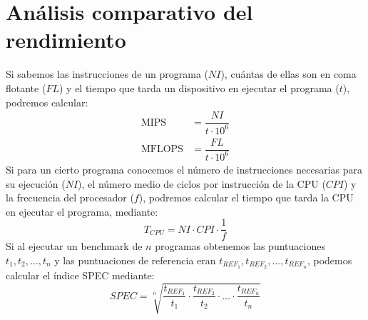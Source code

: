 \section{Análisis comparativo del rendimiento}
Si sabemos las instrucciones de un programa ($NI$), cuántas de ellas son en coma flotante ($FL$) y el tiempo que tarda un dispositivo en ejecutar el programa ($t$), podremos calcular:
\begin{align*}
    \text{MIPS} &= \dfrac{NI}{t\cdot 10^6} \\
    \text{MFLOPS} &= \dfrac{FL}{t\cdot 10^6}
\end{align*}
Si para un cierto programa conocemos el número de instrucciones necesarias para su ejecución ($NI$), el número medio de ciclos por instrucción de la CPU ($CPI$) y la frecuencia del procesador ($f$), podremos calcular el tiempo que tarda la CPU en ejecutar el programa, mediante:
\begin{equation*}
    T_{CPU} = NI\cdot CPI \cdot \dfrac{1}{f}
\end{equation*}
Si al ejecutar un benchmark de $n$ programas obtenemos las puntuaciones $t_1,t_2,\ldots,t_n$ y las puntuaciones de referencia eran $t_{REF_1}, t_{REF_2}, \ldots, t_{REF_n}$, podemos calcular el índice SPEC mediante:
\begin{equation*}
    SPEC = \sqrt[n]{\dfrac{t_{REF_1}}{t_1} \cdot \dfrac{t_{REF_2}}{t_2} \cdot \ldots \cdot \dfrac{t_{REF_n}}{t_n}}
\end{equation*}

